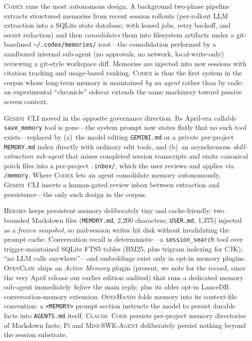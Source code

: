 \documentclass[11pt,a4paper]{article}
\newcommand{\clcode}{\textsc{Claude~Code}\xspace}
\newcommand{\cdx}{\textsc{Codex}\xspace}
\newcommand{\oh}{\textsc{OpenHands}\xspace}
\newcommand{\mswe}{\textsc{Mini-SWE-Agent}\xspace}
\newcommand{\ocl}{\textsc{OpenClaw}\xspace}
\newcommand{\gemini}{\textsc{Gemini~CLI}\xspace}
\newcommand{\hrm}{\textsc{Hermes}\xspace}
\newcommand{\pib}{\textsc{Pi}\xspace}
\begin{document}
\cdx{} runs the most autonomous design.
A background two-phase pipeline extracts structured memories from recent session rollouts (per-rollout LLM extraction into a SQLite state database, with leased jobs, retry backoff, and secret redaction) and then \emph{consolidates} them into filesystem artifacts under a git-baselined \texttt{\textasciitilde/.codex/memories/} root---the consolidation performed by a sandboxed internal sub-agent (no approvals, no network, local-write-only) reviewing a git-style workspace diff.
Memories are injected into new sessions with citation tracking and usage-based ranking.
\cdx{} is thus the first system in the corpus whose long-term memory is maintained \emph{by an agent} rather than by code; an experimental ``chronicle'' sidecar extends the same machinery toward passive screen context.

\gemini{} moved in the opposite governance direction.
Its April-era callable \texttt{save\_memory} tool is gone---the system prompt now states flatly that no such tool exists---replaced by (a)~the model editing \texttt{GEMINI.md} or a private per-project \texttt{MEMORY.md} index directly with ordinary edit tools, and (b)~an asynchronous \emph{skill-extraction sub-agent} that mines completed session transcripts and emits canonical patch files into a per-project \texttt{.inbox/}, which the user reviews and applies via \texttt{/memory}.
Where \cdx{} lets an agent consolidate memory autonomously, \gemini{} inserts a human-gated review inbox between extraction and persistence---the only such design in the corpus.

\hrm{} keeps persistent memory deliberately tiny and cache-friendly: two bounded Markdown files (\texttt{MEMORY.md}, 2{,}200 characters; \texttt{USER.md}, 1{,}375) injected as a \emph{frozen snapshot}, so mid-session writes hit disk without invalidating the prompt cache.
Conversation recall is deterministic---a \texttt{session\_search} tool over trigger-maintained SQLite FTS5 tables (BM25, plus trigram indexing for CJK), ``no LLM calls anywhere''---and embeddings exist only in opt-in memory plugins.
\ocl{} ships an \emph{Active Memory} plugin (present, we note for the record, since the very April release our earlier edition audited) that runs a dedicated memory sub-agent immediately \emph{before} the main reply, plus its older opt-in LanceDB conversation-memory extension.
\oh{} folds memory into its context-file convention: a \texttt{<MEMORY>} prompt section instructs the model to persist durable facts into \texttt{AGENTS.md} itself.
\clcode{} persists per-project memory directories of Markdown facts; \pib{} and \mswe{} deliberately persist nothing beyond the session substrate.
\end{document}
